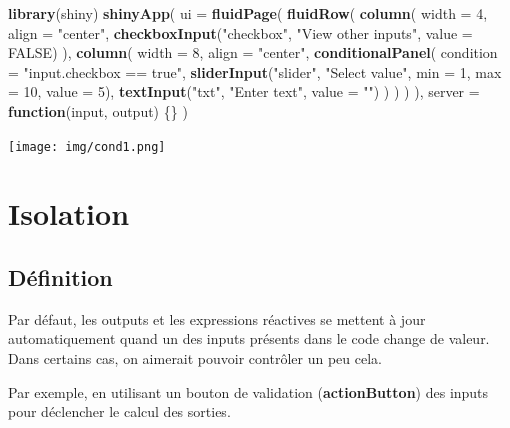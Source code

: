\documentclass[
]{article}
\newenvironment{Shaded}{\begin{snugshade}}{\end{snugshade}}
\newcommand{\AttributeTok}[1]{\textcolor[rgb]{0.13,0.29,0.53}{#1}}
\newcommand{\ConstantTok}[1]{\textcolor[rgb]{0.56,0.35,0.01}{#1}}
\newcommand{\ControlFlowTok}[1]{\textcolor[rgb]{0.13,0.29,0.53}{\textbf{#1}}}
\newcommand{\DecValTok}[1]{\textcolor[rgb]{0.00,0.00,0.81}{#1}}
\newcommand{\FunctionTok}[1]{\textcolor[rgb]{0.13,0.29,0.53}{\textbf{#1}}}
\newcommand{\NormalTok}[1]{#1}
\newcommand{\StringTok}[1]{\textcolor[rgb]{0.31,0.60,0.02}{#1}}
\begin{document}
\begin{Shaded}
\begin{Highlighting}[]
\FunctionTok{library}\NormalTok{(shiny)}
\FunctionTok{shinyApp}\NormalTok{(}
  \AttributeTok{ui =} \FunctionTok{fluidPage}\NormalTok{(}
    \FunctionTok{fluidRow}\NormalTok{(}
      \FunctionTok{column}\NormalTok{(}
        \AttributeTok{width =} \DecValTok{4}\NormalTok{,}
        \AttributeTok{align =} \StringTok{"center"}\NormalTok{,}
        \FunctionTok{checkboxInput}\NormalTok{(}\StringTok{"checkbox"}\NormalTok{, }\StringTok{"View other inputs"}\NormalTok{, }\AttributeTok{value =} \ConstantTok{FALSE}\NormalTok{)}
\NormalTok{      ),}
      \FunctionTok{column}\NormalTok{(}
        \AttributeTok{width =} \DecValTok{8}\NormalTok{,}
        \AttributeTok{align =} \StringTok{"center"}\NormalTok{,}
        \FunctionTok{conditionalPanel}\NormalTok{(}
          \AttributeTok{condition =} \StringTok{"input.checkbox == true"}\NormalTok{, }
          \FunctionTok{sliderInput}\NormalTok{(}\StringTok{"slider"}\NormalTok{, }\StringTok{"Select value"}\NormalTok{, }\AttributeTok{min =} \DecValTok{1}\NormalTok{, }\AttributeTok{max =} \DecValTok{10}\NormalTok{, }\AttributeTok{value =} \DecValTok{5}\NormalTok{),}
          \FunctionTok{textInput}\NormalTok{(}\StringTok{"txt"}\NormalTok{, }\StringTok{"Enter text"}\NormalTok{, }\AttributeTok{value =} \StringTok{""}\NormalTok{)}
\NormalTok{        )}
\NormalTok{      )}
\NormalTok{    )}
\NormalTok{  ),}
  \AttributeTok{server =} \ControlFlowTok{function}\NormalTok{(input, output) \{\}}
\NormalTok{)}
\end{Highlighting}
\end{Shaded}

\texttt{[image: img/cond1.png]}

\hypertarget{isolation}{%
\section{Isolation}\label{isolation}}

\hypertarget{duxe9finition}{%
\subsection{Définition}\label{duxe9finition}}

Par défaut, les outputs et les expressions réactives se mettent à jour
automatiquement quand un des inputs présents dans le code change de
valeur. Dans certains cas, on aimerait pouvoir contrôler un peu cela.

Par exemple, en utilisant un bouton de validation
(\textbf{actionButton}) des inputs pour déclencher le calcul des
sorties.
\end{document}
